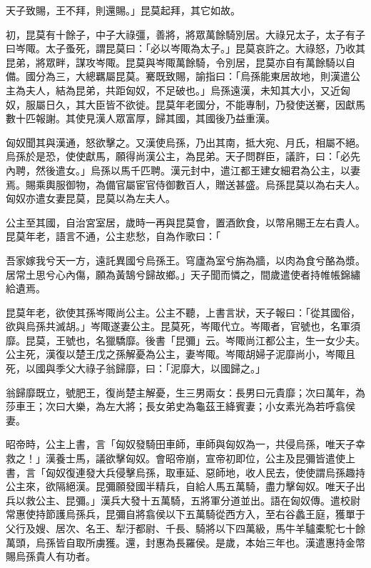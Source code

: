 \begin{pinyinscope}
天子致賜，王不拜，則還賜。」昆莫起拜，其它如故。

初，昆莫有十餘子，中子大祿彊，善將，將眾萬餘騎別居。大祿兄太子，太子有子曰岑陬。太子蚤死，謂昆莫曰：「必以岑陬為太子。」昆莫哀許之。大祿怒，乃收其昆弟，將眾畔，謀攻岑陬。昆莫與岑陬萬餘騎，令別居，昆莫亦自有萬餘騎以自備。國分為三，大總羈屬昆莫。騫既致賜，諭指曰：「烏孫能東居故地，則漢遣公主為夫人，結為昆弟，共距匈奴，不足破也。」烏孫遠漢，未知其大小，又近匈奴，服屬日久，其大臣皆不欲徙。昆莫年老國分，不能專制，乃發使送騫，因獻馬數十匹報謝。其使見漢人眾富厚，歸其國，其國後乃益重漢。

匈奴聞其與漢通，怒欲擊之。又漢使烏孫，乃出其南，抵大宛、月氏，相屬不絕。烏孫於是恐，使使獻馬，願得尚漢公主，為昆弟。天子問群臣，議許，曰：「必先內聘，然後遣女。」烏孫以馬千匹聘。漢元封中，遣江都王建女細君為公主，以妻焉。賜乘輿服御物，為備官屬宦官侍御數百人，贈送甚盛。烏孫昆莫以為右夫人。匈奴亦遣女妻昆莫，昆莫以為左夫人。

公主至其國，自治宮室居，歲時一再與昆莫會，置酒飲食，以幣帛賜王左右貴人。昆莫年老，語言不通，公主悲愁，自為作歌曰：「

吾家嫁我兮天一方，遠託異國兮烏孫王。穹廬為室兮旃為牆，以肉為食兮酪為漿。居常土思兮心內傷，願為黃鵠兮歸故鄉。」天子聞而憐之，間歲遣使者持帷帳錦繡給遺焉。

昆莫年老，欲使其孫岑陬尚公主。公主不聽，上書言狀，天子報曰：「從其國俗，欲與烏孫共滅胡。」岑陬遂妻公主。昆莫死，岑陬代立。岑陬者，官號也，名軍須靡。昆莫，王號也，名獵驕靡。後書「昆彌」云。岑陬尚江都公主，生一女少夫。公主死，漢復以楚王戊之孫解憂為公主，妻岑陬。岑陬胡婦子泥靡尚小，岑陬且死，以國與季父大祿子翁歸靡，曰：「泥靡大，以國歸之。」

翁歸靡既立，號肥王，復尚楚主解憂，生三男兩女：長男曰元貴靡；次曰萬年，為莎車王；次曰大樂，為左大將；長女弟史為龜茲王絳賓妻；小女素光為若呼翕侯妻。

昭帝時，公主上書，言「匈奴發騎田車師，車師與匈奴為一，共侵烏孫，唯天子幸救之！」漢養士馬，議欲擊匈奴。會昭帝崩，宣帝初即位，公主及昆彌皆遣使上書，言「匈奴復連發大兵侵擊烏孫，取車延、惡師地，收人民去，使使謂烏孫趣持公主來，欲隔絕漢。昆彌願發國半精兵，自給人馬五萬騎，盡力擊匈奴。唯天子出兵以救公主、昆彌。」漢兵大發十五萬騎，五將軍分道並出。語在匈奴傳。遣校尉常惠使持節護烏孫兵，昆彌自將翕侯以下五萬騎從西方入，至右谷蠡王庭，獲單于父行及嫂、居次、名王、犁汙都尉、千長、騎將以下四萬級，馬牛羊驢橐駝七十餘萬頭，烏孫皆自取所虜獲。還，封惠為長羅侯。是歲，本始三年也。漢遣惠持金幣賜烏孫貴人有功者。


\end{pinyinscope}
